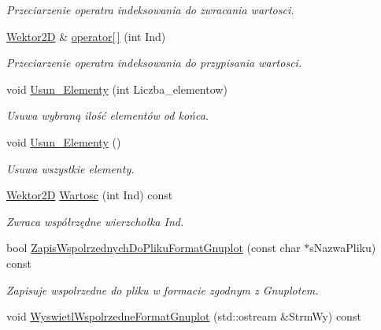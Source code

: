 \begin{DoxyCompactItemize}
\begin{DoxyCompactList}\small\item\em Przeciarzenie operatra indeksowania do zwracania wartosci. \end{DoxyCompactList}\item 
\hypertarget{class_zbior_wierzcholkow_a1c9f3256632426050a16d0bf42460851}{\hyperlink{class_wektor2_d}{Wektor2\+D} \& \hyperlink{class_zbior_wierzcholkow_a1c9f3256632426050a16d0bf42460851}{operator\mbox{[}$\,$\mbox{]}} (int Ind)}\label{class_zbior_wierzcholkow_a1c9f3256632426050a16d0bf42460851}

\begin{DoxyCompactList}\small\item\em Przeciarzenie operatra indeksowania do przypisania wartosci. \end{DoxyCompactList}\item 
void \hyperlink{class_zbior_wierzcholkow_a3b8c2d3bd48a46074dcb6666b0c58370}{Usun\+\_\+\+Elementy} (int Liczba\+\_\+elementow)
\begin{DoxyCompactList}\small\item\em Usuwa wybraną ilość elementów od końca. \end{DoxyCompactList}\item 
\hypertarget{class_zbior_wierzcholkow_a81a031e1bfaf4d85d5526546f529e1e0}{void \hyperlink{class_zbior_wierzcholkow_a81a031e1bfaf4d85d5526546f529e1e0}{Usun\+\_\+\+Elementy} ()}\label{class_zbior_wierzcholkow_a81a031e1bfaf4d85d5526546f529e1e0}

\begin{DoxyCompactList}\small\item\em Usuwa wszystkie elementy. \end{DoxyCompactList}\item 
\hypertarget{class_zbior_wierzcholkow_a933a445a6773468ce7be082dae36e52b}{\hyperlink{class_wektor2_d}{Wektor2\+D} \hyperlink{class_zbior_wierzcholkow_a933a445a6773468ce7be082dae36e52b}{Wartosc} (int Ind) const }\label{class_zbior_wierzcholkow_a933a445a6773468ce7be082dae36e52b}

\begin{DoxyCompactList}\small\item\em Zwraca współrzędne wierzchołka Ind. \end{DoxyCompactList}\item 
bool \hyperlink{class_zbior_wierzcholkow_af56f72995e3ad976f411d27c3a96345a}{Zapis\+Wspolrzednych\+Do\+Pliku\+Format\+Gnuplot} (const char $\ast$s\+Nazwa\+Pliku) const 
\begin{DoxyCompactList}\small\item\em Zapisuje wspolrzedne do pliku w formacie zgodnym z Gnuplotem. \end{DoxyCompactList}\item 
\hypertarget{class_zbior_wierzcholkow_a670d9bc6060a08274e363d3f3bfc1d4f}{void \hyperlink{class_zbior_wierzcholkow_a670d9bc6060a08274e363d3f3bfc1d4f}{Wyswietl\+Wspolrzedne\+Format\+Gnuplot} (std\+::ostream \&Strm\+Wy) const }\label{class_zbior_wierzcholkow_a670d9bc6060a08274e363d3f3bfc1d4f}


\end{DoxyCompactItemize}
